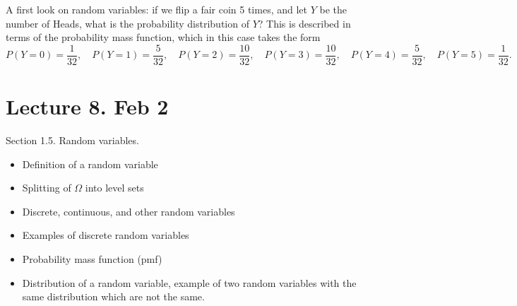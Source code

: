 \documentclass[letterpaper,11pt,oneside,reqno]{amsart}
\numberwithin{equation}{section}
\theoremstyle{definition}
\begin{document}
A first look on random variables: if we flip a fair coin 5 times, and let $Y$ be the number of Heads, 
what is the probability distribution of $Y$? This is described in terms of the probability mass function,
which in this case takes the form
\begin{equation*}
	P(Y=0)=\frac{1}{32},\quad
	P(Y=1)=\frac{5}{32},\quad
	P(Y=2)=\frac{10}{32},\quad
	P(Y=3)=\frac{10}{32},\quad
	P(Y=4)=\frac{5}{32},\quad
	P(Y=5)=\frac{1}{32}.
\end{equation*}

\section{Lecture 8. Feb 2}

Section 1.5. Random variables. 
\begin{itemize}
	\item Definition of a random variable
	\item Splitting of $\Omega$ into level sets
	\item Discrete, continuous, and other random variables
	\item Examples of discrete random variables
	\item Probability mass function (pmf)
	\item Distribution of a random variable, example of 
		two random variables with the same distribution
		which are not the same.
\end{itemize}
\end{document}

